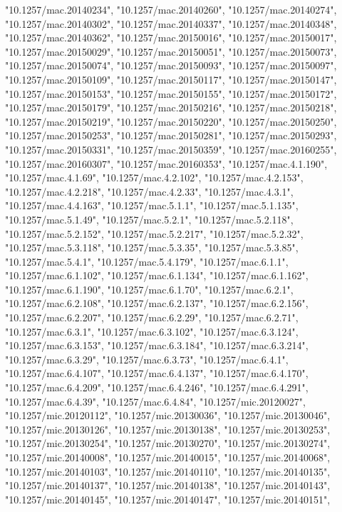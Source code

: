 \documentclass[]{article}
\begin{document}
\begin{itemize}
  "10.1257/mac.20140234", "10.1257/mac.20140260",
  "10.1257/mac.20140274", "10.1257/mac.20140302",
  "10.1257/mac.20140337", "10.1257/mac.20140348",
  "10.1257/mac.20140362", "10.1257/mac.20150016",
  "10.1257/mac.20150017", "10.1257/mac.20150029",
  "10.1257/mac.20150051", "10.1257/mac.20150073",
  "10.1257/mac.20150074", "10.1257/mac.20150093",
  "10.1257/mac.20150097", "10.1257/mac.20150109",
  "10.1257/mac.20150117", "10.1257/mac.20150147",
  "10.1257/mac.20150153", "10.1257/mac.20150155",
  "10.1257/mac.20150172", "10.1257/mac.20150179",
  "10.1257/mac.20150216", "10.1257/mac.20150218",
  "10.1257/mac.20150219", "10.1257/mac.20150220",
  "10.1257/mac.20150250", "10.1257/mac.20150253",
  "10.1257/mac.20150281", "10.1257/mac.20150293",
  "10.1257/mac.20150331", "10.1257/mac.20150359",
  "10.1257/mac.20160255", "10.1257/mac.20160307",
  "10.1257/mac.20160353", "10.1257/mac.4.1.190", "10.1257/mac.4.1.69",
  "10.1257/mac.4.2.102", "10.1257/mac.4.2.153", "10.1257/mac.4.2.218",
  "10.1257/mac.4.2.33", "10.1257/mac.4.3.1", "10.1257/mac.4.4.163",
  "10.1257/mac.5.1.1", "10.1257/mac.5.1.135", "10.1257/mac.5.1.49",
  "10.1257/mac.5.2.1", "10.1257/mac.5.2.118", "10.1257/mac.5.2.152",
  "10.1257/mac.5.2.217", "10.1257/mac.5.2.32", "10.1257/mac.5.3.118",
  "10.1257/mac.5.3.35", "10.1257/mac.5.3.85", "10.1257/mac.5.4.1",
  "10.1257/mac.5.4.179", "10.1257/mac.6.1.1", "10.1257/mac.6.1.102",
  "10.1257/mac.6.1.134", "10.1257/mac.6.1.162", "10.1257/mac.6.1.190",
  "10.1257/mac.6.1.70", "10.1257/mac.6.2.1", "10.1257/mac.6.2.108",
  "10.1257/mac.6.2.137", "10.1257/mac.6.2.156", "10.1257/mac.6.2.207",
  "10.1257/mac.6.2.29", "10.1257/mac.6.2.71", "10.1257/mac.6.3.1",
  "10.1257/mac.6.3.102", "10.1257/mac.6.3.124", "10.1257/mac.6.3.153",
  "10.1257/mac.6.3.184", "10.1257/mac.6.3.214", "10.1257/mac.6.3.29",
  "10.1257/mac.6.3.73", "10.1257/mac.6.4.1", "10.1257/mac.6.4.107",
  "10.1257/mac.6.4.137", "10.1257/mac.6.4.170", "10.1257/mac.6.4.209",
  "10.1257/mac.6.4.246", "10.1257/mac.6.4.291", "10.1257/mac.6.4.39",
  "10.1257/mac.6.4.84", "10.1257/mic.20120027", "10.1257/mic.20120112",
  "10.1257/mic.20130036", "10.1257/mic.20130046",
  "10.1257/mic.20130126", "10.1257/mic.20130138",
  "10.1257/mic.20130253", "10.1257/mic.20130254",
  "10.1257/mic.20130270", "10.1257/mic.20130274",
  "10.1257/mic.20140008", "10.1257/mic.20140015",
  "10.1257/mic.20140068", "10.1257/mic.20140103",
  "10.1257/mic.20140110", "10.1257/mic.20140135",
  "10.1257/mic.20140137", "10.1257/mic.20140138",
  "10.1257/mic.20140143", "10.1257/mic.20140145",
  "10.1257/mic.20140147", "10.1257/mic.20140151",

\end{itemize}
\end{document}
